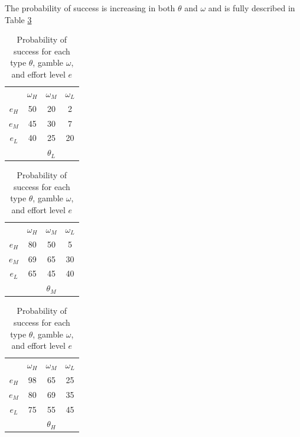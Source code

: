 \documentclass[
  12pt,
]{article}
\begin{document}
The probability of success is increasing in both \(\theta\) and
\(\omega\) and is fully described in Table \ref{tab:DGP}

\begin{table}[htbp]
\centering

\begin{tabular}{ c|c|c|c|}
  
  \multicolumn{1}{c}{} & \multicolumn{1}{c}{$\omega_H$} & \multicolumn{1}{c}{$\omega_M$} & \multicolumn{1}{c}{$\omega_L$}\\
  \cline{2-4}
  $e_H$ & 50 & 20 & 2 \\
  \cline{2-4}
  $e_M$ & 45 & 30 & 7 \\
  \cline{2-4}
  $e_L$ & 40 & 25 & 20 \\

  \cline{2-4}
  \multicolumn{1}{c}{} & \multicolumn{1}{c}{} & \multicolumn{1}{c}{$\theta_L$} & \multicolumn{1}{c}{}\\
\end{tabular}
\hspace{.3cm} 
\begin{tabular}{ c|c|c|c|}
  
  \multicolumn{1}{c}{} & \multicolumn{1}{c}{$\omega_H$} & \multicolumn{1}{c}{$\omega_M$} & \multicolumn{1}{c}{$\omega_L$}\\
  \cline{2-4}
  $e_H$ & 80 & 50 & 5 \\
  \cline{2-4}
  $e_M$ & 69 & 65 & 30 \\
  \cline{2-4}
  $e_L$ & 65 & 45 & 40 \\
  \cline{2-4}
  \multicolumn{1}{c}{} & \multicolumn{1}{c}{} & \multicolumn{1}{c}{$\theta_M$} & \multicolumn{1}{c}{}\\
\end{tabular}
\hspace{.3cm} 
\begin{tabular}{ c|c|c|c|}
  
  \multicolumn{1}{c}{} & \multicolumn{1}{c}{$\omega_H$} & \multicolumn{1}{c}{$\omega_M$} & \multicolumn{1}{c}{$\omega_L$}\\
  \cline{2-4}
  $e_H$ & 98 & 65 & 25 \\
  \cline{2-4}
  $e_M$ & 80 & 69 & 35 \\
  \cline{2-4}
  $e_L$ & 75 & 55 & 45 \\
  \cline{2-4}
  \multicolumn{1}{c}{} & \multicolumn{1}{c}{} & \multicolumn{1}{c}{$\theta_H$} & \multicolumn{1}{c}{}\\
\end{tabular}

\caption{Probability of success for each type $\theta$, gamble $\omega$, and effort level $e$}
\label{tab:DGP}
\end{table}
\end{document}
